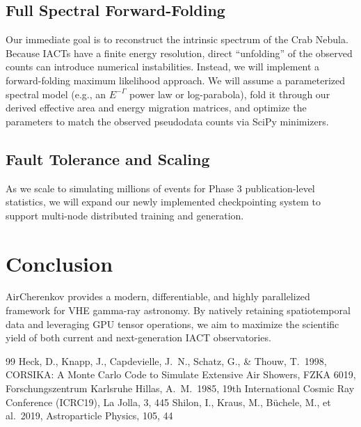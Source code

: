 \documentclass[twocolumn,times]{aastex631}
\begin{document}
\subsection{Full Spectral Forward-Folding}
Our immediate goal is to reconstruct the intrinsic spectrum of the Crab Nebula. Because IACTs have a finite energy resolution, direct ``unfolding'' of the observed counts can introduce numerical instabilities. Instead, we will implement a forward-folding maximum likelihood approach. We will assume a parameterized spectral model (e.g., an $E^{-\Gamma}$ power law or log-parabola), fold it through our derived effective area and energy migration matrices, and optimize the parameters to match the observed pseudodata counts via SciPy minimizers.

\subsection{Fault Tolerance and Scaling}
As we scale to simulating millions of events for Phase 3 publication-level statistics, we will expand our newly implemented checkpointing system to support multi-node distributed training and generation.

\section{Conclusion}
AirCherenkov provides a modern, differentiable, and highly parallelized framework for VHE gamma-ray astronomy. By natively retaining spatiotemporal data and leveraging GPU tensor operations, we aim to maximize the scientific yield of both current and next-generation IACT observatories.

\begin{thebibliography}{99}
 Heck, D., Knapp, J., Capdevielle, J.~N., Schatz, G., \& Thouw, T.\ 1998, CORSIKA: A Monte Carlo Code to Simulate Extensive Air Showers, FZKA 6019, Forschungszentrum Karlsruhe
 Hillas, A.~M.\ 1985, 19th International Cosmic Ray Conference (ICRC19), La Jolla, 3, 445
 Shilon, I., Kraus, M., B{\"u}chele, M., et al.\ 2019, Astroparticle Physics, 105, 44
\end{thebibliography}
\end{document}
